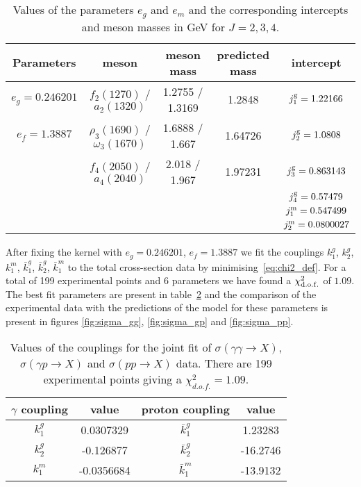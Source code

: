\documentclass[a4paper,12pt]{article}
\begin{document}
\begin{table}[t!]
\centering
\caption{Values of the parameters $e_g$ and $e_m$ and the corresponding intercepts and meson masses in GeV for $J=2,3,4$.}
\vspace{0.5cm}
\begin{tabular}{|c|c|c|c|c|}
\hline
Parameters & meson  & meson mass & predicted mass & intercept  \\
\hline
$e_g = 0.246201$ & $f_2(1270)$ / $a_2(1320)$ & 1.2755 / 1.3169 & 1.2848 & $j^{\rm{g}}_1 = 1.22166$  \\
\hline
$e_f = 1.3887$  & $\rho_3(1690)$ / $\omega_3(1670)$ & 1.6888 / 1.667 & 1.64726 & $j^{\rm{g}}_2 = 1.0808$\\
\hline
& $f_4(2050)$ / $a_4(2040)$ & 2.018 / 1.967 & 1.97231 & $j^{\rm{g}}_3 = 0.863143$ \\
\hline
 & & & & $j^{\rm{g}}_4 = 0.57479$ \\
\hline
 & & & & $j^{\rm{m}}_1 = 0.547499$ \\
\hline
 & & & & $j^{\rm{m}}_2 = 0.0800027$ \\
\hline
\end{tabular}
\label{table:regge_traj}
\end{table}

After fixing the kernel with $e_g = 0.246201$, $e_f = 1.3887$ we fit the couplings $k^{g}_1$, $k^{g}_2$, $k^{m}_1$,  $\bar{k}^{g}_1$, $\bar{k}^{g}_2$, $\bar{k}^{m}_1$ to the total cross-section data by minimising~\ref{eq:chi2_def}. For a total of 199 experimental points and 6 parameters we have found a $\chi^2_{\rm d.o.f.}$ of $1.09$. The best fit parameters are present in table~\ref{table:best_fit_pars_all_sigma} and the comparison of the experimental data with the predictions of the model for these parameters is present in figures \ref{fig:sigma_gg}, \ref{fig:sigma_gp} and \ref{fig:sigma_pp}.
\begin{table}[t!]
\centering
\caption{Values of the couplings for the joint fit of $\sigma\left(\gamma \gamma \to X\right)$, $\sigma\left(\gamma p \to X\right)$ and $\sigma\left(p p \to X\right)$ data. There are 199 experimental points giving a  $\chi^2_{d.o.f.}=1.09$.}
\vspace{0.5cm}
\begin{tabular}{|c|c|c|c|}
\hline
$\gamma$ coupling & value & proton coupling & value  \\
\hline
$k^{g}_1$ & 0.0307329 & $\bar{k}^{g}_1$ & 1.23283 \\
\hline
$k^{g}_2$ & -0.126877 & $\bar{k}^{g}_2$ & -16.2746 \\
\hline
$k^{m}_1$ & -0.0356684 & $\bar{k}^{m}_1$ & -13.9132  \\
\hline
\end{tabular}
\label{table:best_fit_pars_all_sigma}
\end{table}
\end{document}
